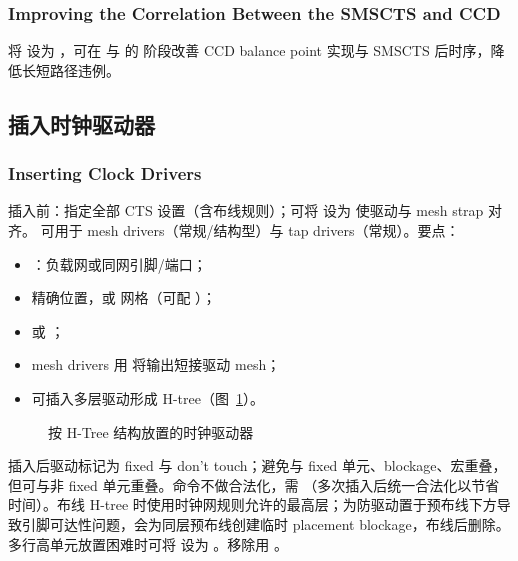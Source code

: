 \subsubsection*{Improving the Correlation Between the SMSCTS and CCD}

将  设为 ，可在  与  的  阶段改善 CCD balance point 实现与 SMSCTS 后时序，降低长短路径违例。

\subsection{插入时钟驱动器}
\subsubsection*{Inserting Clock Drivers}

插入前：指定全部 CTS 设置（含布线规则）；可将  设为  使驱动与 mesh strap 对齐。 可用于 mesh drivers（常规/结构型）与 tap drivers（常规）。要点：
\begin{itemize}
  \item {}：负载网或同网引脚/端口；
  \item {} 精确位置，或  网格（可配 ）；
  \item {} 或 ；
  \item mesh drivers 用  将输出短接驱动 mesh；
  \item {} 可插入多层驱动形成 H-tree（图~\ref{fig:mscts-drivers}）。
\end{itemize}

\begin{figure}[htbp]
\centering
{}
\caption{按 H-Tree 结构放置的时钟驱动器}
\label{fig:mscts-drivers}
\end{figure}

插入后驱动标记为 fixed 与 don't touch；避免与 fixed 单元、blockage、宏重叠，但可与非 fixed 单元重叠。命令不做合法化，需 （多次插入后统一合法化以节省时间）。布线 H-tree 时使用时钟网规则允许的最高层；为防驱动置于预布线下方导致引脚可达性问题，会为同层预布线创建临时 placement blockage，布线后删除。多行高单元放置困难时可将  设为 。移除用 。

